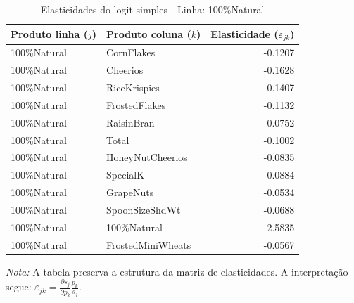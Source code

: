 \begingroup
\begin{table}[H]
\centering
\caption{Elasticidades do logit simples - Linha: 100\%Natural}
\label{tab:elas-100natural}
\small
\begin{tabular}{llr}
\toprule
Produto linha ($j$) & Produto coluna ($k$) & Elasticidade ($\varepsilon_{jk}$) \\
\midrule
100\%Natural & CornFlakes & -0.1207 \\
100\%Natural & Cheerios & -0.1628 \\
100\%Natural & RiceKrispies & -0.1407 \\
100\%Natural & FrostedFlakes & -0.1132 \\
100\%Natural & RaisinBran & -0.0752 \\
100\%Natural & Total & -0.1002 \\
100\%Natural & HoneyNutCheerios & -0.0835 \\
100\%Natural & SpecialK & -0.0884 \\
100\%Natural & GrapeNuts & -0.0534 \\
100\%Natural & SpoonSizeShdWt & -0.0688 \\
100\%Natural & 100\%Natural & 2.5835 \\
100\%Natural & FrostedMiniWheats & -0.0567 \\
\bottomrule
\end{tabular}

\vspace{0.3em}
\footnotesize
\textit{Nota:} A tabela preserva a estrutura da matriz de elasticidades. A interpretação segue: $\varepsilon_{jk}=\frac{\partial s_j}{\partial p_k}\frac{p_k}{s_j}$.
\end{table}
\endgroup


